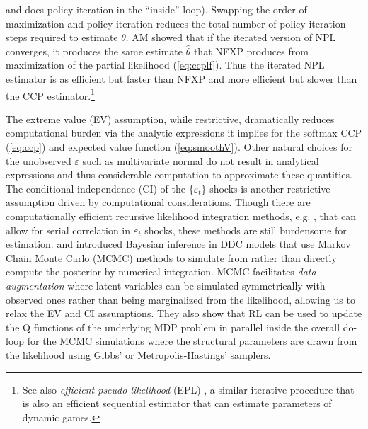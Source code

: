 and does policy iteration in the ``inside'' loop). Swapping the order of maximization
and policy iteration reduces the total number of policy iteration steps required to 
estimate $\theta$. AM showed that if the iterated version of  NPL converges, it produces the
same  estimate $\hat\theta$ that  NFXP produces from maximization of the partial likelihood  (\ref{eq:ccplf}).
Thus the iterated NPL estimator is as efficient but faster than NFXP and more efficient but slower than the CCP
estimator.\footnote{\footnotesize
See also {\it efficient pseudo likelihood\/} (EPL) \citep{dearingblevins:2025}, a similar iterative
procedure that is also an efficient sequential estimator that 
can estimate parameters of dynamic games.}  

The extreme value (EV) assumption, while restrictive, dramatically reduces computational burden 
via the analytic expressions it implies for the softmax CCP (\ref{eq:ccp}) and expected value function (\ref{eq:smoothV}).
Other natural choices for the unobserved $\varepsilon$ such as multivariate normal do not result in analytical expressions  
and thus considerable computation to approximate these quantities. 
The conditional independence (CI) of the $\{\varepsilon_t\}$ shocks is another restrictive assumption driven by
computational considerations. Though there are computationally
efficient recursive likelihood integration methods, e.g. \citet{reich:2018}, that can allow
for serial correlation in $\varepsilon_t$ shocks, these methods are still burdensome for estimation.
\citet{ijc:2009} and \citet{norets:2009} introduced
Bayesian inference in DDC models that use Markov Chain Monte Carlo (MCMC) methods to
simulate from rather than directly compute the posterior by numerical integration. 
MCMC facilitates {\it data augmentation\/} where latent variables 
can be simulated symmetrically with observed ones rather than being marginalized from the likelihood, 
allowing us to relax the EV and CI assumptions. They also show that RL can be used to update the Q functions
of the underlying MDP problem in parallel inside the overall do-loop for the MCMC simulations
where the structural parameters are drawn from the likelihood using Gibbs' or Metropolis-Hastings' samplers.

